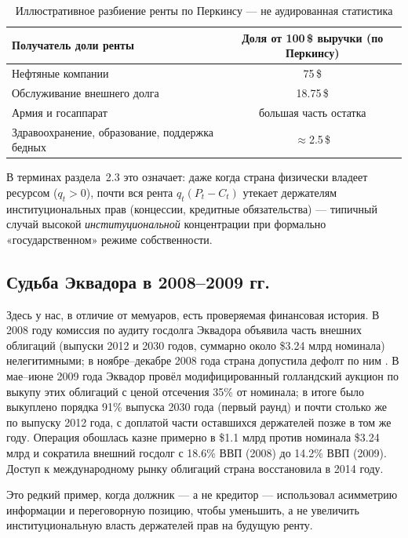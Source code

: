 \documentclass[11pt]{article}
\begin{document}
\begin{table}[H]
\centering
\begin{tabular}{@{}lc@{}}
\toprule
\textbf{Получатель доли ренты} & \textbf{Доля от 100\,\$ выручки (по Перкинсу)} \\
\midrule
Нефтяные компании & 75\,\$ \\
Обслуживание внешнего долга & 18.75\,\$ \\
Армия и госаппарат & большая часть остатка \\
Здравоохранение, образование, поддержка бедных & $\approx$2.5\,\$ \\
\bottomrule
\end{tabular}
\caption{Иллюстративное разбиение ренты по Перкинсу — не аудированная статистика}
\end{table}

В терминах раздела~2.3 это означает: даже когда страна физически владеет ресурсом ($q_t>0$), почти вся рента $q_t(P_t-C_t)$ утекает держателям институциональных прав (концессии, кредитные обязательства) — типичный случай высокой \emph{институциональной} концентрации при формально «государственном» режиме собственности.

\subsection{Судьба Эквадора в 2008--2009 гг.}
Здесь у нас, в отличие от мемуаров, есть проверяемая финансовая история. В 2008 году комиссия по аудиту госдолга Эквадора объявила часть внешних облигаций (выпуски 2012 и 2030 годов, суммарно около \$3.24 млрд номинала) нелегитимными; в ноябре--декабре 2008 года страна допустила дефолт по ним \cite{cepal2009ecuador}. В мае--июне 2009 года Эквадор провёл модифицированный голландский аукцион по выкупу этих облигаций с ценой отсечения 35\% от номинала; в итоге было выкуплено порядка 91\% выпуска 2030 года (первый раунд) и почти столько же по выпуску 2012 года, с доплатой части оставшихся держателей позже в том же году. Операция обошлась казне примерно в \$1.1 млрд против номинала \$3.24 млрд и сократила внешний госдолг с 18.6\% ВВП (2008) до 14.2\% ВВП (2009). Доступ к международному рынку облигаций страна восстановила в 2014 году.

Это редкий пример, когда должник — а не кредитор — использовал асимметрию информации и переговорную позицию, чтобы уменьшить, а не увеличить институциональную власть держателей прав на будущую ренту.

\end{document}
